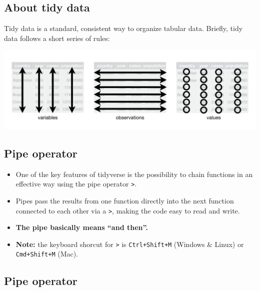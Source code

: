 \documentclass[
  letterpaper,
  DIV=11,
  numbers=noendperiod,
  oneside]{scrartcl}
\begin{document}
\subsection{About tidy data}\label{about-tidy-data}

Tidy data is a standard, consistent way to organize tabular data.
Briefly, tidy data follows a short series of rules:

\includegraphics[width=1\textwidth,height=\textheight]{Intro_R_files/mediabag/tidy1.png}


\subsection{Pipe operator}\label{pipe-operator}

\begin{itemize}
\item
  One of the key features of tidyverse is the possibility to chain
  functions in an effective way using the pipe operator
  \texttt{\textbar{}\textgreater{}}.
\item
  Pipes pass the results from one function directly into the next
  function connected to each other via a
  \texttt{\textbar{}\textgreater{}}, making the code easy to read and
  write.
\item
  \textbf{The pipe basically means ``and then''.}
\item
  \textbf{Note:} the keyboard shorcut for
  \texttt{\textbar{}\textgreater{}} is \texttt{Ctrl+Shift+M} (Windows \&
  Linux) or \texttt{Cmd+Shift+M} (Mac).
\end{itemize}

\subsection{Pipe operator}\label{pipe-operator-1}
\end{document}
